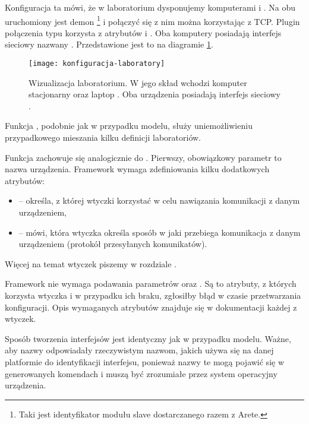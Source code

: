 \documentclass[00-praca-magisterska.tex]{subfiles}
\begin{document}
Konfiguracja ta mówi, że w laboratorium  dysponujemy komputerami
 i . Na obu uruchomiony jest demon
\footnote{Taki jest identyfikator modułu slave dostarczanego
razem z Arete.} i połączyć się z nim można korzystając z TCP. Plugin
połączenia typu  korzysta z atrybutów  i . Oba
komputery posiadają interfejs sieciowy nazwany . Przedstawione jest
to na diagramie \ref{fig:konfiguracja-laboratory}.

\begin{figure}[htb]
\begin{center}
\leavevmode
\texttt{[image: konfiguracja-laboratory]}
\end{center}
\caption{Wizualizacja laboratorium. W jego skład wchodzi komputer stacjonarny
 oraz laptop . Oba urządzenia posiadają interfejs
sieciowy .}
\label{fig:konfiguracja-laboratory}
\end{figure}

Funkcja , podobnie jak w przypadku modelu, służy
uniemożliwieniu przypadkowego mieszania kilku definicji laboratoriów.

Funkcja  zachowuje się analogicznie do .
Pierwszy, obowiązkowy parametr to nazwa urządzenia. Framework wymaga
zdefiniowania kilku dodatkowych atrybutów:
\begin{itemize}
\item {} -- określa, z której wtyczki korzystać w celu
nawiązania komunikacji z danym urządzeniem,
\item {} -- mówi, która wtyczka określa sposób w jaki przebiega
komunikacja z danym urządzeniem (protokół przesyłanych komunikatów).
\end{itemize}

Więcej na temat wtyczek piszemy w rozdziale .

Framework nie wymaga podawania parametrów  oraz . Są to
atrybuty, z których korzysta wtyczka  i w przypadku ich braku,
zgłosiłby błąd w czasie przetwarzania konfiguracji. Opis wymaganych atrybutów
znajduje się w dokumentacji każdej z wtyczek.

Sposób tworzenia interfejsów jest identyczny jak w przypadku modelu. Ważne, aby
nazwy odpowiadały rzeczywistym nazwom, jakich używa się na danej platformie do
identyfikacji interfejsu, ponieważ nazwy te mogą pojawić się w generowanych
komendach i muszą być zrozumiałe przez system operacyjny urządzenia.
\end{document}
